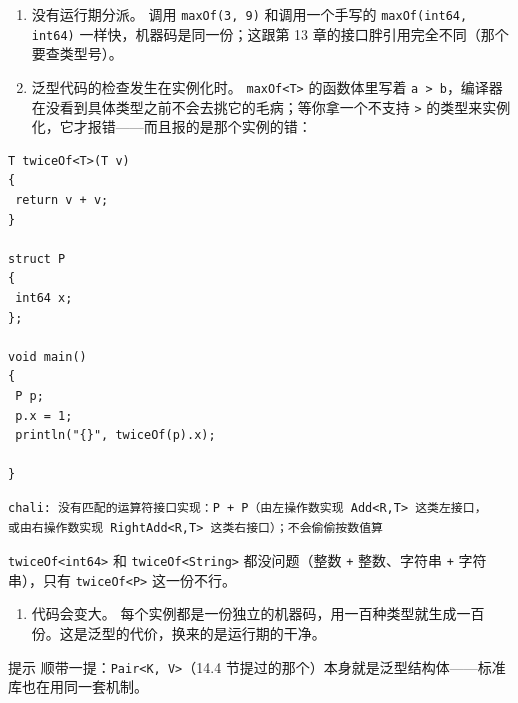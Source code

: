 \begin{enumerate}

\item 没有运行期分派。 调用 \texttt{max\allowbreak{}Of(\allowbreak{}3,\allowbreak{} 9)\allowbreak{}} 和调用一个手写的 \texttt{max\allowbreak{}Of(\allowbreak{}int64,\allowbreak{} int64)\allowbreak{}} 一样快，机器码是同一份；这跟第 13 章的接口胖引用完全不同（那个要查类型号）。

\item 泛型代码的检查发生在实例化时。 \texttt{max\allowbreak{}Of<\allowbreak{}T>\allowbreak{}} 的函数体里写着 \texttt{a >\allowbreak{} b}，编译器在没看到具体类型之前不会去挑它的毛病；等你拿一个不支持 \texttt{>\allowbreak{}} 的类型来实例化，它才报错——而且报的是那个实例的错：

\end{enumerate}

\par
\medskip
\begin{lstlisting}[style=chali]
T twiceOf<T>(T v)
{
 return v + v;
}

struct P
{
 int64 x;
};

void main()
{
 P p;
 p.x = 1;
 println("{}", twiceOf(p).x);

}
\end{lstlisting}
\par
\medskip

\par
\medskip
\begin{lstlisting}[style=out]
chali: 没有匹配的运算符接口实现：P + P（由左操作数实现 Add<R,T> 这类左接口，
或由右操作数实现 RightAdd<R,T> 这类右接口）；不会偷偷按数值算
\end{lstlisting}
\par
\medskip

\texttt{twice\allowbreak{}Of<\allowbreak{}int64>\allowbreak{}} 和 \texttt{twice\allowbreak{}Of<\allowbreak{}String>\allowbreak{}} 都没问题（整数 \texttt{+} 整数、字符串 \texttt{+} 字符串），只有 \texttt{twice\allowbreak{}Of<\allowbreak{}P>\allowbreak{}} 这一份不行。

\begin{enumerate}[start=3]

\item 代码会变大。 每个实例都是一份独立的机器码，用一百种类型就生成一百份。这是泛型的代价，换来的是运行期的干净。

\end{enumerate}

\begin{tip}{提示}
顺带一提：\texttt{Pair<\allowbreak{}K,\allowbreak{} V>\allowbreak{}}（14.4 节提过的那个）本身就是泛型结构体——标准库也在用同一套机制。
\end{tip}

